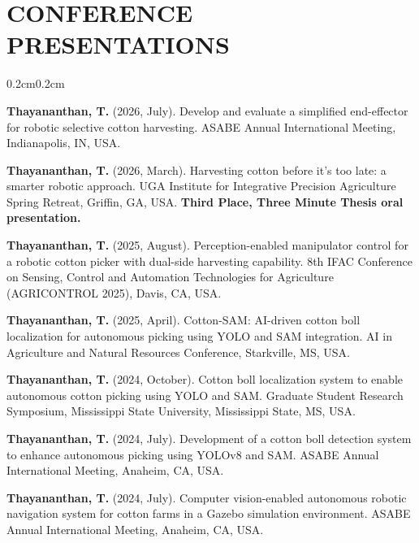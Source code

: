 \documentclass[10pt, letterpaper]{article}
\newcommand{\textbfr}[1]{\textbf{#1}}
\newenvironment{onecolentry}{%
    \begin{adjustwidth}{0.2cm}{0.2cm}
}{\end{adjustwidth}}
\newenvironment{pres}{%
  \begin{enumerate}[label={[P\arabic*]}, leftmargin=1.15cm, labelsep=0.2cm,
                    topsep=0.08cm, parsep=0.08cm, partopsep=0pt, itemsep=0pt]
}{\end{enumerate}}
\begin{document}
\section{CONFERENCE PRESENTATIONS}
\vspace{0.08cm}
\begin{onecolentry}
\begin{pres}
    \item \textbfr{Thayananthan, T.} (2026, July). Develop and evaluate a simplified
    end-effector for robotic selective cotton harvesting. ASABE Annual International
    Meeting, Indianapolis, IN, USA.

    \item \textbfr{Thayananthan, T.} (2026, March). Harvesting cotton before it's too
    late: a smarter robotic approach. UGA Institute for Integrative Precision
    Agriculture Spring Retreat, Griffin, GA, USA.
    \textbf{Third Place, Three Minute Thesis oral presentation.}

    \item \textbfr{Thayananthan, T.} (2025, August). Perception-enabled manipulator
    control for a robotic cotton picker with dual-side harvesting capability.
    8th IFAC Conference on Sensing, Control and Automation Technologies for
    Agriculture (AGRICONTROL 2025), Davis, CA, USA.

    \item \textbfr{Thayananthan, T.} (2025, April). Cotton-SAM: AI-driven cotton boll
    localization for autonomous picking using YOLO and SAM integration.
    AI in Agriculture and Natural Resources Conference, Starkville, MS, USA.

    \item \textbfr{Thayananthan, T.} (2024, October). Cotton boll localization system
    to enable autonomous cotton picking using YOLO and SAM. Graduate Student Research
    Symposium, Mississippi State University, Mississippi State, MS, USA.

    \item \textbfr{Thayananthan, T.} (2024, July). Development of a cotton boll
    detection system to enhance autonomous picking using YOLOv8 and SAM.
    ASABE Annual International Meeting, Anaheim, CA, USA.

    \item \textbfr{Thayananthan, T.} (2024, July). Computer vision-enabled autonomous
    robotic navigation system for cotton farms in a Gazebo simulation environment.
    ASABE Annual International Meeting, Anaheim, CA, USA.


\end{pres}
\end{onecolentry}
\end{document}
